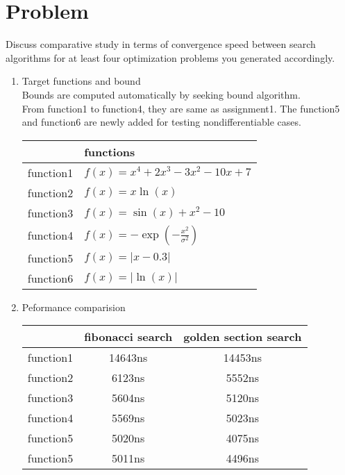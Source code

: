 \documentclass[12pt,letterpaper]{article}
\begin{document}
\section*{Problem}

Discuss comparative study in terms of convergence speed between search algorithms for at least four optimization problems you generated accordingly.

\begin{enumerate}
\item Target functions and bound
\\ Bounds are computed automatically by seeking bound algorithm.
\\ From function1 to function4, they are same as assignment1. The function5 and function6 are newly added for testing nondifferentiable cases.
\begin{center}
    \begin{tabular}{| c | l | }
        \hline
                  & functions                             \\
        \hline
        function1 & $f(x)=x^4 +2x^3-3x^2-10x+7$           \\
        function2 & $f(x)=x\ln(x)$                        \\
        function3 & $f(x)=\sin(x)+x^2-10$                 \\
        function4 & $f(x)=-\exp(-\frac{x^2}{\sigma ^2})$  \\
        function5 & $f(x)=|x-0.3|$                        \\
        function6 & $f(x)=|\ln(x)|$                       \\
        \hline
    \end{tabular}
\end{center}

\item Peformance comparision
\begin{center}
\begin{tabular}{ | c | c | c |}
    \hline
              & fibonacci search & golden section search \\
    \hline
    function1 &  14643ns    & 14453ns   \\
    function2 &  6123ns     & 5552ns    \\
    function3 &  5604ns     & 5120ns    \\
    function4 &  5569ns     & 5023ns    \\
    function5 &  5020ns     & 4075ns    \\
    function5 &  5011ns     & 4496ns    \\
    \hline
\end{tabular}
\end{center}


\end{enumerate}
\end{document}
